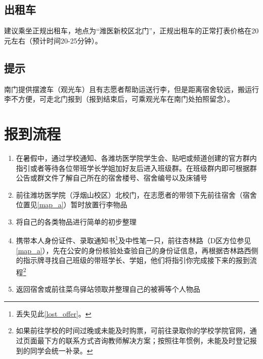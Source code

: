 \subsection[出租车]{出租车}
建议乘坐正规出租车，地点为“潍医新校区北门”，正规出租车的正常打表价格在20元左右（预计时间20-25分钟）。

\subsection[提示]{提示}
南门提供摆渡车（观光车）且有志愿者帮助运送行李，但是距离宿舍较远，搬运行李不方便，可走北门报到（报到结束后，可乘观光车在南门处拍照留念）。

\section[报到流程]{报到流程}
\begin{enumerate}
    \item 在暑假中，通过学校通知、各潍坊医学院学生会、贴吧或频道创建的官方群内指引或者等待各位带班学长学姐加好友后进入班级群。在班级群内即可根据群公告或群文件了解自己所在的宿舍楼号、宿舍编号以及床铺号
    \item 前往潍坊医学院（浮烟山校区）北校门，在志愿者\footnotemark 的带领下先前往宿舍（宿舍位置见\uline{\ref{map_a}}）暂时放置行李物品
    \item 将自己的各类物品进行简单的初步整理
    \item 携带本人身份证件、录取通知书\footnote{丢失见此\uline{\ref{lost_offer}}。}及中性笔一只，前往杏林路（D区方位参见\uline{\ref{map_a}}），先在公安的身份核验处查验自己的身份证信息，再根据杏林路西侧的指示牌寻找自己班级的带班学长、学姐，他们将指引你完成接下来的报到流程\footnote{如果前往学校的时间过晚或未能及时购票，可前往录取你的学校学院官网，通过页面最下方的联系方式咨询教师解决方案；按照往年惯例，未能及时登记报到的同学会统一补录。}
    \item 返回宿舍或前往菜鸟驿站领取并整理自己的被褥等个人物品
\end{enumerate}